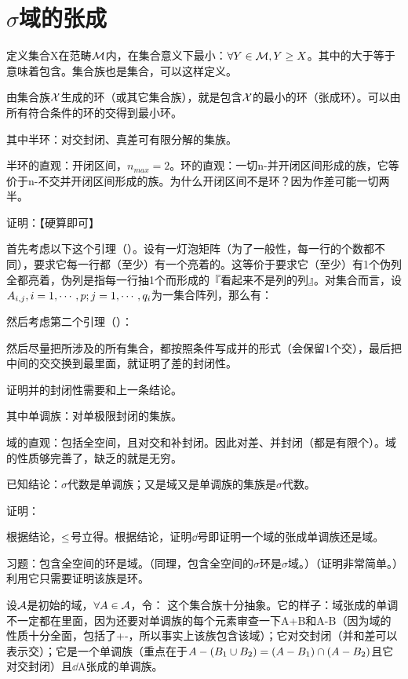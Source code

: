 

\section{$\sigma$域的张成}

定义集合X在范畴$\mbox{$\mathcal{M}$}$内，在集合意义下最小：$\forall Y\in\mbox{$\mathcal{M}$}, Y\ge X$。其中的大于等于意味着包含。集合族也是集合，可以这样定义。

由集合族$\mbox{$\mathcal{X}$}$生成的环（或其它集合族），就是包含$\mbox{$\mathcal{X}$}$的最小的环（张成环）。可以由所有符合条件的环的交得到最小环。

其中半环：对交封闭、真差可有限分解的集族。

半环的直观：开闭区间，$n_{max}=2$。环的直观：一切n-并开闭区间形成的族，它等价于n-不交并开闭区间形成的族。为什么开闭区间不是环？因为作差可能一切两半。

证明：【硬算即可】

首先考虑以下这个引理（）。设有一灯泡矩阵（为了一般性，每一行的个数都不同），要求它每一行都（至少）有一个亮着的。这等价于要求它（至少）有1个伪列全都亮着，伪列是指每一行抽1个而形成的『看起来不是列的列』。对集合而言，设$A_{i,j}, i=1,\cdots,p; j=1,\cdots,q_i$为一集合阵列，那么有：

然后考虑第二个引理（）：

然后尽量把所涉及的所有集合，都按照条件写成并的形式（会保留1个交），最后把中间的交交换到最里面，就证明了差的封闭性。

证明并的封闭性需要和上一条结论。

其中单调族：对单极限封闭的集族。

域的直观：包括全空间，且对交和补封闭。因此对差、并封闭（都是有限个）。域的性质够完善了，缺乏的就是无穷。

已知结论：$\sigma$代数是单调族；又是域又是单调族的集族是$\sigma$代数。

证明：

根据结论，$\le$号立得。根据结论，证明$\dd$号即证明一个域的张成单调族还是域。

习题：包含全空间的环是域。（同理，包含全空间的$\sigma$环是$\sigma$域。）（证明非常简单。）利用它只需要证明该族是环。

设$\mbox{$\mathcal{A}$}$是初始的域，$\forall A\in\mbox{$\mathcal{A}$}$，令：
这个集合族十分抽象。它的样子：域张成的单调不一定都在里面，因为还要对单调族的每个元素审查一下A+B和A-B（因为域的性质十分全面，包括了+-，所以事实上该族包含该域）；它对交封闭（并和差可以表示交）；它是一个单调族（重点在于$A-(B_1\cup B_2)=(A-B_1)\cap(A-B_2)$且它对交封闭）且$\dd$A张成的单调族。

